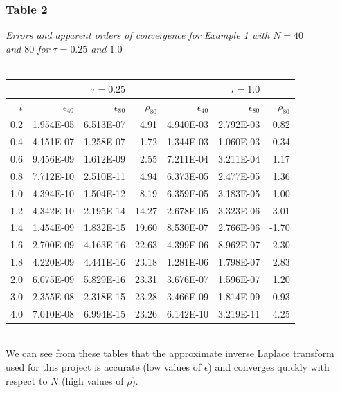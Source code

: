 \documentclass[letterpaper, 12pt]{article}
\begin{document}
	\subsubsection*{Table 2} \small\textit{Errors and apparent orders of convergence for Example 1 with $N=40$\\ and $80$ for $\tau=0.25$ and $1.0$} \\\\
	\normalsize
	\begin{tabular}{r||rrr|rrr}
			     &             &$\tau = 0.25$		  &	 	  	 &             &$\tau = 1.0$    	&		  \\
		\hline
		$t$  &$\epsilon_{40}$  &$\epsilon_{80}$  &$\rho_{80}$  &$\epsilon_{40}$  &$\epsilon_{80}$  &$\rho_{80}$ \\ 
		\hline
		0.2    &1.954E-05    &6.513E-07         &4.91    &4.940E-03    &2.792E-03         &0.82 \\ 
		0.4    &4.151E-07    &1.258E-07         &1.72    &1.344E-03    &1.060E-03         &0.34 \\ 
		0.6    &9.456E-09    &1.612E-09         &2.55    &7.211E-04    &3.211E-04         &1.17 \\ 
		0.8    &7.712E-10    &2.510E-11         &4.94    &6.373E-05    &2.477E-05         &1.36 \\ 
		1.0    &4.394E-10    &1.504E-12         &8.19    &6.359E-05    &3.183E-05         &1.00 \\ 
		1.2    &4.342E-10    &2.195E-14        &14.27    &2.678E-05    &3.323E-06         &3.01 \\ 
		1.4    &1.454E-09    &1.832E-15        &19.60    &8.530E-07    &2.766E-06        &-1.70 \\ 
		1.6    &2.700E-09    &4.163E-16        &22.63    &4.399E-06    &8.962E-07         &2.30 \\ 
		1.8    &4.220E-09    &4.441E-16        &23.18    &1.281E-06    &1.798E-07         &2.83 \\ 
		2.0    &6.075E-09    &5.829E-16        &23.31    &3.676E-07    &1.596E-07         &1.20 \\ 
		3.0    &2.355E-08    &2.318E-15        &23.28    &3.466E-09    &1.814E-09         &0.93 \\ 
		4.0    &7.010E-08    &6.994E-15        &23.26    &6.142E-10    &3.219E-11         &4.25 \\ 
		\hline
	\end{tabular}\\
	
	We can see from these tables that the approximate inverse Laplace transform used for this project is accurate (low values of $\epsilon$) and converges quickly with respect to $N$ (high values of $\rho$).
	
\end{document}

